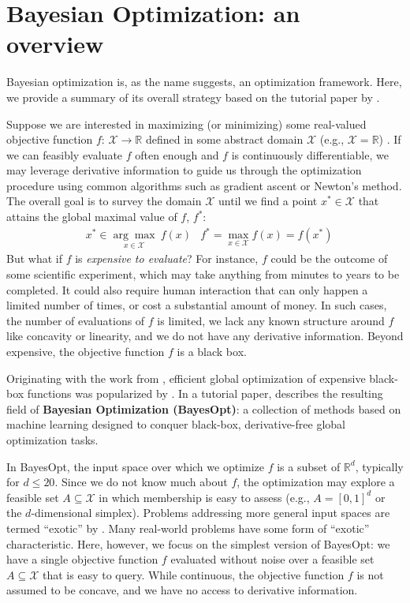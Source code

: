 

\section{Bayesian Optimization: an overview}

Bayesian optimization is, as the name suggests, an optimization framework. Here, we provide a summary of its overall strategy based on the tutorial paper by .

\vspace{1em}

Suppose we are interested in maximizing (or minimizing) some real-valued objective function $f{:\,}\mathcal{X}\rightarrow\mathbb{R}$ defined in some abstract domain $\mathcal{X}$ (e.g., $\mathcal{X}=\mathbb{R}$) \cite{Garnett2023}. If we can feasibly evaluate $f$ often enough and $f$ is continuously differentiable, we may leverage derivative information to guide us through the optimization procedure using common algorithms such as gradient ascent or Newton's method. The overall goal is to survey the domain $\mathcal{X}$ until we find a point $x^*\in \mathcal{X}$ that attains the global maximal value of $f$, $f^*$:
\begin{align}
    &x^*\in \underset{x\in\mathcal{X}}{\arg\max}\ f(x)&f^*=\max_{x\in\mathcal{X}}f(x)=f(x^*)\label{optim}
\end{align}
But what if $f$ is \textit{expensive to evaluate}? For instance, $f$ could be the outcome of some scientific experiment, which may take anything from minutes to years to be completed. It could also require human interaction that can only happen a limited number of times, or cost a substantial amount of money. In such cases, the number of evaluations of $f$ is limited, we lack any known structure around $f$ like concavity or linearity, and we do not have any derivative information. Beyond expensive, the objective function $f$ is a black box.

Originating with the work from , efficient global optimization of expensive black-box functions was popularized by . In a tutorial paper,  describes the resulting field of \textbf{Bayesian Optimization (BayesOpt)}: a collection of methods based on machine learning designed to conquer black-box, derivative-free global optimization tasks.

In BayesOpt, the input space over which we optimize $f$ is a subset of $\mathbb{R}^d$, typically for $d\leq 20$. Since we do not know much about $f$, the optimization may explore a feasible set $A\subseteq\mathcal{X}$ in which membership is easy to assess (e.g., $A=[0, 1]^d$ or the $d$-dimensional simplex). Problems addressing more general input spaces are termed ``exotic'' by . Many real-world problems have some form of ``exotic'' characteristic. Here, however, we focus on the simplest version of BayesOpt: we have a single objective function $f$ evaluated without noise over a feasible set $A\subseteq\mathcal{X}$ that is easy to query. While continuous, the objective function $f$ is not assumed to be concave, and we have no access to derivative information. 

